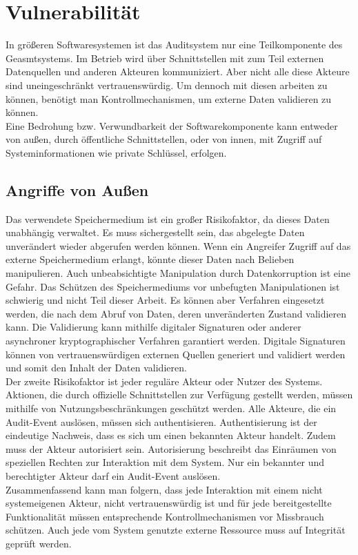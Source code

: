 \chapter{Vulnerabilität}
In größeren Softwaresystemen ist das Auditsystem nur eine Teilkomponente des Geasmtsystems. Im Betrieb wird über Schnittstellen mit zum Teil externen Datenquellen und anderen Akteuren kommuniziert. Aber nicht alle diese Akteure sind uneingeschränkt vertrauenswürdig. Um dennoch mit diesen arbeiten zu können, benötigt man Kontrollmechanismen, um externe Daten validieren zu können.\cite{8494085}\\
Eine Bedrohung bzw. Verwundbarkeit der Softwarekomponente kann entweder von außen, durch öffentliche Schnittstellen, oder von innen, mit Zugriff auf Systeminformationen wie  private Schlüssel, erfolgen.\cite{8574150}

\section{Angriffe von Außen}
Das verwendete Speichermedium ist ein großer Risikofaktor, da dieses Daten unabhängig verwaltet. Es muss sichergestellt sein, das abgelegte Daten unverändert wieder abgerufen werden können. Wenn ein Angreifer Zugriff auf das externe Speichermedium erlangt, könnte dieser Daten nach Belieben manipulieren. Auch unbeabsichtigte Manipulation durch Datenkorruption ist eine Gefahr. Das Schützen des Speichermediums vor unbefugten Manipulationen ist schwierig und nicht Teil dieser Arbeit. Es können aber Verfahren eingesetzt werden, die nach dem Abruf von Daten, deren unveränderten Zustand validieren kann. Die Validierung kann mithilfe digitaler Signaturen oder anderer asynchroner kryptographischer Verfahren garantiert werden. Digitale Signaturen können von vertrauenswürdigen externen Quellen generiert und validiert werden und somit den Inhalt der Daten validieren.\\
Der zweite Risikofaktor ist jeder reguläre Akteur oder Nutzer des Systems. Aktionen, die durch offizielle Schnittstellen zur Verfügung gestellt werden, müssen mithilfe von Nutzungsbeschränkungen geschützt werden. Alle Akteure, die ein Audit-Event auslösen, müssen sich authentisieren. Authentisierung ist der eindeutige Nachweis, dass es sich um einen bekannten Akteur handelt. Zudem muss der Akteur autorisiert sein. Autorisierung beschreibt das Einräumen von speziellen Rechten zur Interaktion mit dem System. Nur ein bekannter und berechtigter Akteur darf ein Audit-Event auslösen.\\
Zusammenfassend kann man folgern, dass jede Interaktion mit einem nicht systemeigenen Akteur, nicht vertrauenswürdig ist und für jede bereitgestellte Funktionalität müssen entsprechende Kontrollmechanismen vor Missbrauch schützen. Auch jede vom System genutzte externe Ressource muss auf Integrität geprüft werden.\cite{8494085}

